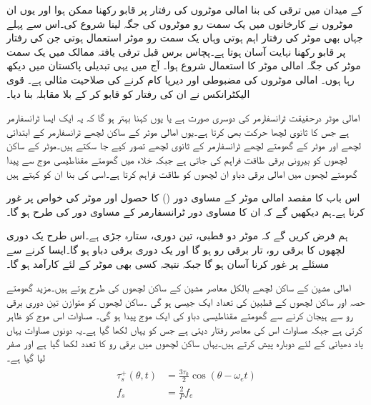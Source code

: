  کے میدان میں ترقی کی بنا امالی موٹروں کی رفتار پر قابو رکھنا ممکن ہوا اور یوں ان موٹروں نے کارخانوں میں یک سمت  رو موٹروں کی جگہ لینا شروع کی۔اس سے پہلے جہاں بھی موٹر کی رفتار اہم  ہوتی وہاں یک سمت  رو موٹر  استعمال ہوتی جن کی رفتار پر قابو رکھنا نہایت آسان ہوتا ہے۔پچاس  برس  قبل ترقی یافتہ ممالک میں یک سمت موٹر  کی جگہ  امالی موٹر کا استعمال شروع ہوا۔ آج میں یہی تبدیلی پاکستان میں دیکھ رہا ہوں۔ امالی موٹروں کی مضبوطی اور دیرپا کام کرنے کی صلاحیت مثالی ہے۔ قوی الیکٹرانکس نے ان کی رفتار کو قابو کر کے  بلا مقابلہ بنا دیا۔

امالی موٹر درحقیقت  ٹرانسفارمر کی دوسری صورت ہے یا یوں کہنا بہتر ہو گا کہ یہ ایک ایسا ٹرانسفارمر ہے جس کا ثانوی لچھا حرکت بھی کرتا ہے۔یوں امالی موٹر کے ساکن لچھے ٹرانسفارمر کے ابتدائی لچھے اور موٹر کے گھومتے لچھے ٹرانسفارمر کے ثانوی لچھے تصور کیے جا سکتے ہیں۔موٹر کے ساکن لچھوں کو بیرونی برقی طاقت فراہم کی جاتی ہے جبکہ  خلاء میں گھومتے مقناطیسی موج سے پیدا گھومتے لچھوں میں امالی برقی دباو  ان لچھوں کو طاقت فراہم کرتا ہے۔اسی کی بنا ان کو  کہتے ہیں

 اس باب کا مقصد امالی موٹر کے مساوی دور  ()  کا حصول اور موٹر کی خواص پر غور کرنا ہے۔ہم دیکھیں گے کہ ان کا مساوی دور ٹرانسفارمر کے مساوی دور کی طرح  ہو گا۔

ہم فرض کریں گے کہ موٹر دو قطبی، تین دوری،  ستارہ  جڑی ہے۔اس طرح یک دوری لچھوں کا برقی رو، تار برقی رو ہو گا اور  یک دوری برقی دباو
  ہو گا۔ایسا کرنے سے مسئلے پر غور کرنا آسان ہو گا جبکہ نتیجہ کسی بھی موٹر کے لئے کارآمد ہو گا۔

امالی مشین کے ساکن لچھے بالکل معاصر مشین کے ساکن لچھوں کی طرح ہوتے ہیں۔مزید  گھومتے حصہ اور ساکن لچھوں کے قطبین کی تعداد ایک جیسی ہو گی ۔ساکن لچھوں کو متوازن تین دوری برقی رو سے ہیجان  کرنے سے گھومتے مقناطیسی دباو کی ایک  موج پیدا ہو گی۔ مساوات   اس موج کو ظاہر کرتی ہے جبکہ مساوات   اس کی معاصر رفتار  دیتی ہے جس کو یہاں  لکھا گیا ہے۔یہ دونوں مساوات یہاں یاد دھیانی کے لئے دوبارہ پیش کرتے  ہیں۔یہاں ساکن لچھوں میں برقی رو کا تعدد  لکھا گیا ہے اور   صفر لیا گیا ہے۔
\begin{gather}
\begin{aligned}\label{مساوات_امالی_گھومتا_مقناطیسی_دباو_الف}
\tau_s^+ (\theta,t)&=\frac{3 \tau_0}{2} \cos (\theta-\omega_ e t)\\
f_s&=\frac{2}{P} f_e
\end{aligned}
\end{gather}

